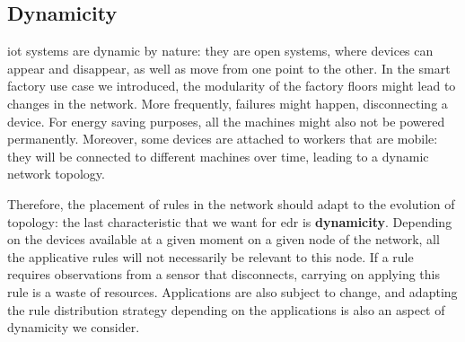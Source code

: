 \documentclass{iosart2c}
\newcommand{\Nicolas}[1]{\textcolor{red}{ Nicolas: \textbf{#1} }}
\begin{document}
\subsection{Dynamicity}

\gls{iot} systems are dynamic by nature: they are open systems, where devices can appear and disappear, as well as move from one point to the other. 
In the smart factory use case we introduced, the modularity of the factory floors might lead to changes in the network.
More frequently, failures might happen, disconnecting a device. 
For energy saving purposes, all the machines might also not be powered permanently.
Moreover, some devices are attached to workers that are mobile: they will be connected to different machines over time, leading to a dynamic network topology.

Therefore, the placement of rules in the network should adapt to the evolution of topology: the last characteristic that we want for \gls{edr} is \textbf{dynamicity}.
Depending on the devices available at a given moment on a given node of the network, all the applicative rules will not necessarily be relevant to this node.
If a rule requires observations from a sensor that disconnects, carrying on applying this rule is a waste of resources. 
Applications are also subject to change, and adapting the rule distribution strategy depending on the applications is also an aspect of dynamicity we consider.

\end{document}

